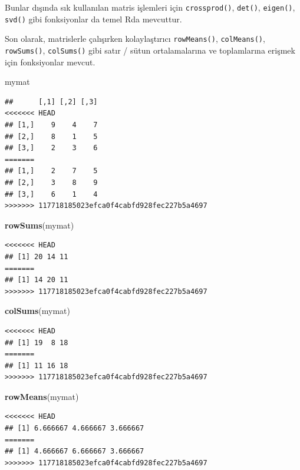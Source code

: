 \documentclass[]{book}
\newenvironment{Shaded}{\begin{snugshade}}{\end{snugshade}}
\newcommand{\KeywordTok}[1]{\textcolor[rgb]{0.13,0.29,0.53}{\textbf{#1}}}
\newcommand{\NormalTok}[1]{#1}
\begin{document}
Bunlar dışında sık kullanılan matris işlemleri için
\texttt{crossprod()}, \texttt{det()}, \texttt{eigen()}, \texttt{svd()}
gibi fonksiyonlar da temel Rda mevcuttur.

Son olarak, matrislerle çalışırken kolaylaştırıcı \texttt{rowMeans()},
\texttt{colMeans()}, \texttt{rowSums()}, \texttt{colSums()} gibi satır /
sütun ortalamalarına ve toplamlarına erişmek için fonksiyonlar mevcut.

\begin{Shaded}
\begin{Highlighting}[]
\NormalTok{mymat}
\end{Highlighting}
\end{Shaded}

\begin{verbatim}
##      [,1] [,2] [,3]
<<<<<<< HEAD
## [1,]    9    4    7
## [2,]    8    1    5
## [3,]    2    3    6
=======
## [1,]    2    7    5
## [2,]    3    8    9
## [3,]    6    1    4
>>>>>>> 117718185023efca0f4cabfd928fec227b5a4697
\end{verbatim}

\begin{Shaded}
\begin{Highlighting}[]
\KeywordTok{rowSums}\NormalTok{(mymat)}
\end{Highlighting}
\end{Shaded}

\begin{verbatim}
<<<<<<< HEAD
## [1] 20 14 11
=======
## [1] 14 20 11
>>>>>>> 117718185023efca0f4cabfd928fec227b5a4697
\end{verbatim}

\begin{Shaded}
\begin{Highlighting}[]
\KeywordTok{colSums}\NormalTok{(mymat)}
\end{Highlighting}
\end{Shaded}

\begin{verbatim}
<<<<<<< HEAD
## [1] 19  8 18
=======
## [1] 11 16 18
>>>>>>> 117718185023efca0f4cabfd928fec227b5a4697
\end{verbatim}

\begin{Shaded}
\begin{Highlighting}[]
\KeywordTok{rowMeans}\NormalTok{(mymat)}
\end{Highlighting}
\end{Shaded}

\begin{verbatim}
<<<<<<< HEAD
## [1] 6.666667 4.666667 3.666667
=======
## [1] 4.666667 6.666667 3.666667
>>>>>>> 117718185023efca0f4cabfd928fec227b5a4697
\end{verbatim}
\end{document}
